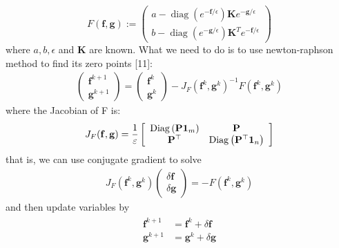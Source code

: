 \documentclass{article}
\begin{document}
\begin{large}
\begin{displaymath}
F(\mathbf { f },\mathbf { g}) :=
\left( \begin{array}{c}
a -  \operatorname { diag } (   e ^ { -\mathbf { f }  / \epsilon } ) \mathbf { K }  e ^ { -\mathbf { g }  / \epsilon } \\
b -  \operatorname { diag } (   e ^ { -\mathbf { g }  / \epsilon } ) \mathbf { K }^T  e ^ { -\mathbf { f }  / \epsilon }
\end{array} \right)
\end{displaymath}
where $a,b,\epsilon$ and $\mathbf { K}$ are known.
What we need to do is to use newton-raphson method to find its zero points [11]:
\begin{align}
\left( \begin{array} { l } { \mathbf { f }^ { k + 1 } } \\ { \mathbf { g } ^ { k + 1 } } \end{array} \right) = \left( \begin{array} { l } { \mathbf { f } ^ { k } } \\ { \mathbf { g } ^ { k } } \end{array} \right) - J _ { F } \left( \mathbf { f } ^ { k } , \mathbf { g } ^ { k } \right) ^ { - 1 } F \left( \mathbf { f } ^ { k } , \mathbf { g } ^ { k } \right)
\end{align}
where the Jacobian of F is:
\begin{align}
J _ { F } ( \mathbf { f }  ,  \mathbf { g } ) = \frac { 1 } { \varepsilon } \left[ \begin{array} { c c } { \operatorname { Diag } \left( \mathbf{P} \mathbf { 1 } _ { m } \right) } & { \mathbf{P} } \\ { \mathbf{P} ^ { \top } } & { \operatorname { Diag } \left( \mathbf{P} ^ { \top } \mathbf { 1 } _ { n } \right) } \end{array} \right]
\end{align}
that is, we can use conjugate gradient to solve
\begin{align}
J _ { F } \left(  \mathbf {f} ^ { k } ,  \mathbf {g} ^ { k } \right) \left( \begin{array} { c } { \delta  \mathbf {f} } \\ { \delta  \mathbf {g} } \end{array} \right) = - F \left(  \mathbf {f} ^ { k } ,  \mathbf {g} ^ { k } \right)
\end{align}
and then update variables by
\begin{align}
\begin{aligned}  \mathbf {f} ^ { k + 1 } & =  \mathbf {f} ^ { k } + \delta  \mathbf {f} \\  \mathbf {g} ^ { k + 1 } & =  \mathbf {g} ^ { k } + \delta  \mathbf {g} \end{aligned}

\end{align}
\end{large}
\end{document}

